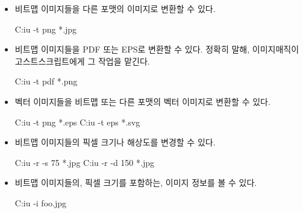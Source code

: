 \begin{itemize}

\item 비트맵 이미지들을 다른 포맷의 이미지로 변환할 수 있다.

\begin{code}
C:\>iu -t png *.jpg
\end{code}

\item 비트맵 이미지들을 PDF 또는 EPS로 변환할 수 있다.
정확히 말해, 이미지매직이 고스트스크립트에게 그 작업을 맡긴다.

\begin{code}
C:\>iu -t pdf *.png
\end{code}

\item 벡터 이미지들을 비트맵 또는 다른 포맷의 벡터 이미지로 변환할 수 있다.

\begin{code}
C:\>iu -t png *.eps
C:\>iu -t eps *.svg
\end{code}

\item 비트맵 이미지들의 픽셀 크기나 해상도를 변경할 수 있다.

\begin{code}
C:\>iu -r -s 75 *.jpg
C:\>iu -r -d 150 *.jpg
\end{code}

\item 비트맵 이미지들의, 픽셀 크기를 포함하는, 이미지 정보를 볼 수 있다.

\begin{code}
C:\>iu -i foo.jpg
\end{code}
\end{itemize}

